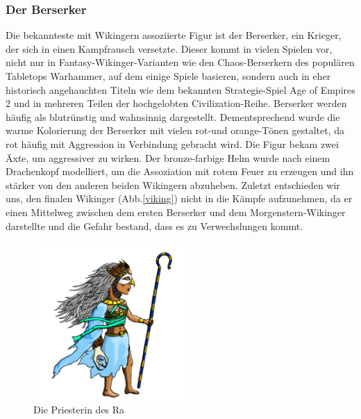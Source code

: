 \documentclass[extern,palatino]{cgBA}
\begin{document}
\subsubsection{Der Berserker}
Die bekannteste mit Wikingern assoziierte Figur ist der Berserker, ein Krieger, der sich in einen Kampfrausch versetzte. Dieser kommt in vielen Spielen vor, nicht nur in Fantasy-Wikinger-Varianten wie den Chaos-Berserkern des populären Tabletops Warhammer, auf dem einige Spiele basieren, sondern auch in eher historisch angehauchten Titeln wie dem bekannten Strategie-Spiel Age of Empires 2 und in mehreren Teilen der hochgelobten  Civilization-Reihe. Berserker werden häufig als blutrünstig und wahnsinnig dargestellt. Dementsprechend wurde die warme Kolorierung der Berserker mit vielen rot-und orange-Tönen gestaltet, da rot häufig mit Aggression in Verbindung gebracht wird. Die Figur bekam zwei Äxte, um aggressiver zu wirken. Der bronze-farbige Helm wurde nach einem Drachenkopf modelliert, um die Assoziation mit rotem Feuer zu erzeugen und ihn stärker von den anderen beiden Wikingern abzuheben. Zuletzt entschieden wir uns, den finalen Wikinger (Abb.\ref{viking}) nicht in die Kämpfe aufzunehmen, da er einen Mittelweg zwischen dem ersten Berserker und dem Morgenstern-Wikinger darstellte und die Gefahr bestand, dass es zu Verwechslungen kommt.
\newpage
\begin{figure}[H]
	\centering
	\includegraphics[height=6cm]{priestess.jpg}
	\caption{Die Priesterin des Ra}
	\label{priestess}
\end{figure}
\end{document}
